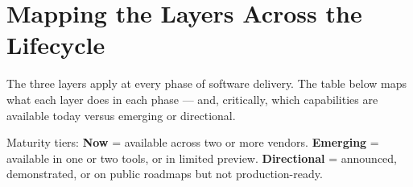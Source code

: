\documentclass[
  a4paper,
  DIV=11,
  numbers=noendperiod]{scrreprt}
\begin{document}
\section{Mapping the Layers Across the
Lifecycle}\label{mapping-the-layers-across-the-lifecycle}

The three layers apply at every phase of software delivery. The table
below maps what each layer does in each phase --- and, critically, which
capabilities are available today versus emerging or directional.

Maturity tiers: \textbf{Now} = available across two or more vendors.
\textbf{Emerging} = available in one or two tools, or in limited
preview. \textbf{Directional} = announced, demonstrated, or on public
roadmaps but not production-ready.

\newpage{}
\end{document}
